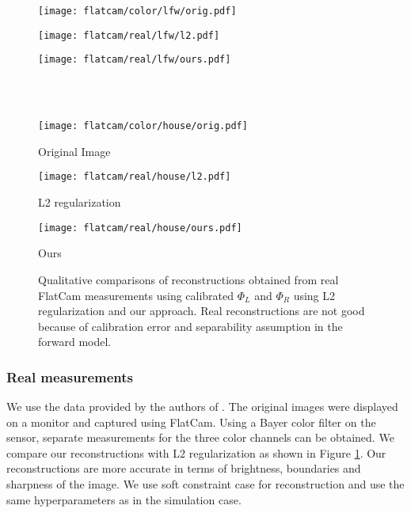 \documentclass[journal,twoside]{IEEEtran}
\begin{document}
\begin{figure}[!t]
    \centering
    \begin{minipage}{0.5\textwidth}
    \begin{minipage}{0.32\textwidth}
    \texttt{[image: flatcam/color/lfw/orig.pdf]}
    \end{minipage}
    \begin{minipage}{0.32\textwidth}
    \texttt{[image: flatcam/real/lfw/l2.pdf]}
    \end{minipage}
    \begin{minipage}{0.32\textwidth}
    \texttt{[image: flatcam/real/lfw/ours.pdf]}
    \end{minipage}\\\\
    
    \begin{minipage}{0.32\textwidth}
    \texttt{[image: flatcam/color/house/orig.pdf]}
    \centerline{Original Image}
    \end{minipage}
    \begin{minipage}{0.32\textwidth}
    \texttt{[image: flatcam/real/house/l2.pdf]}
    \centerline{L2 regularization}
    \end{minipage}
    \begin{minipage}{0.32\textwidth}
    \texttt{[image: flatcam/real/house/ours.pdf]}
    \centerline{Ours}
    \end{minipage}
    \end{minipage}
    \caption{Qualitative comparisons of reconstructions obtained from real FlatCam measurements using calibrated $\Phi_L$ and $\Phi_R$ using L2 regularization and our approach. Real reconstructions are not good because of calibration error and separability assumption in the forward model.}
    \label{fig:flatcam_real}
\end{figure}

\subsubsection{Real measurements}
We use the data provided by the authors of \cite{asif2017flatcam}. The original images were displayed on a monitor and captured using FlatCam. Using a Bayer color filter on the sensor, separate measurements for the three color channels can be obtained. We compare our reconstructions with L2 regularization as shown in Figure \ref{fig:flatcam_real}. Our reconstructions are more accurate in terms of brightness, boundaries and sharpness of the image. We use soft constraint case for reconstruction and use the same hyperparameters as in the simulation case. 
\end{document}
